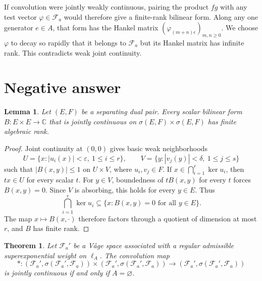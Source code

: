 \documentclass[11pt]{article}
\newtheorem{theorem}{Theorem}
\newtheorem{lemma}{Lemma}
\newcommand{\C}{\mathbb C}
\newcommand{\Fa}{\mathcal F_a}
\begin{document}
If convolution were jointly weakly continuous, pairing the product $fg$ with
any test vector $\varphi\in\Fa$ would therefore give a finite-rank bilinear
form.  Along any one generator $e\in A$, that form has the Hankel matrix
$(\varphi_{(m+n)e})_{m,n\ge0}$.  We choose $\varphi$ to decay so rapidly that
it belongs to $\Fa$ but its Hankel matrix has infinite rank.  This contradicts
weak joint continuity.

\section{Negative answer}

\begin{lemma}\label{lem:finite-rank}
Let $(E,F)$ be a separating dual pair.  Every scalar bilinear form
$B:E\times E\to\C$ that is jointly continuous on
$\sigma(E,F)\times\sigma(E,F)$ has finite algebraic rank.
\end{lemma}

\begin{proof}
Joint continuity at $(0,0)$ gives basic weak neighborhoods
\[
 U=\{x:|u_i(x)|<\varepsilon,\ 1\le i\le r\},\qquad
 V=\{y:|v_j(y)|<\delta,\ 1\le j\le s\}
\]
such that $|B(x,y)|\le1$ on $U\times V$, where $u_i,v_j\in F$.
If $x\in\bigcap_{i=1}^r\ker u_i$, then $tx\in U$ for every scalar $t$.
For $y\in V$, boundedness of $tB(x,y)$ for every $t$ forces $B(x,y)=0$.
Since $V$ is absorbing, this holds for every $y\in E$.  Thus
\[
 \bigcap_{i=1}^r\ker u_i
 \subseteq\{x:B(x,y)=0\text{ for all }y\in E\}.
\]
The map $x\mapsto B(x,\cdot)$ therefore factors through a quotient of
dimension at most $r$, and $B$ has finite rank.
\end{proof}

\begin{theorem}\label{thm:main}
Let $\Fa'$ be a V{\aa}ge space associated with a regular admissible
superexponential weight on $\ell_A$.  The convolution map
\[
 *:(\Fa',\sigma(\Fa',\Fa))\times(\Fa',\sigma(\Fa',\Fa))
 \longrightarrow(\Fa',\sigma(\Fa',\Fa))
\]
is jointly continuous if and only if $A=\varnothing$.
\end{theorem}
\end{document}
